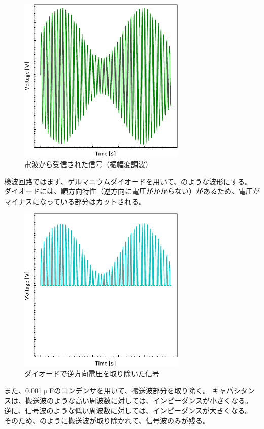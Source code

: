 \documentclass[report.tex]{subfiles}
\begin{document}
\begin{figure}[H]
	\centering
	\includegraphics[width=8cm]{fig/Wave.pdf}
	\caption{電波から受信された信号（振幅変調波）}
	\label{fig:wave}
\end{figure}

検波回路ではまず、ゲルマニウムダイオードを用いて、のような波形にする。
ダイオードには、順方向特性（逆方向に電圧がかからない）があるため、電圧がマイナスになっている部分はカットされる。

\begin{figure}[H]
	\centering
	\includegraphics[width=8cm]{fig/diode.pdf}
	\caption{ダイオードで逆方向電圧を取り除いた信号}
	\label{fig:diode}
\end{figure}

また、0.001\(\upmu\)Fのコンデンサを用いて、搬送波部分を取り除く。
キャパシタンスは、搬送波のような高い周波数に対しては、インピーダンスが小さくなる。
逆に、信号波のような低い周波数に対しては、インピーダンスが大きくなる。
そのため、のように搬送波が取り除かれて、信号波のみが残る。
\end{document}
